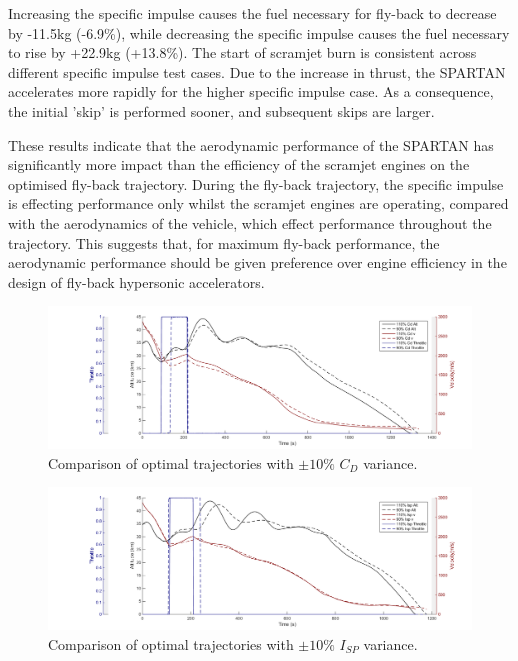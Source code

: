 Increasing the specific impulse causes the fuel necessary for fly-back to decrease by -11.5kg (-6.9\%), while decreasing the specific impulse causes the fuel necessary to rise by +22.9kg (+13.8\%). The start of scramjet burn is consistent across different specific impulse test cases. Due to the increase in thrust, the SPARTAN accelerates more rapidly for the higher specific impulse case. As a consequence, the initial 'skip' is performed sooner, and subsequent skips are larger. 

These results indicate that the aerodynamic performance of the SPARTAN has significantly more impact than the efficiency of the scramjet engines on the optimised fly-back trajectory. During the fly-back trajectory, the specific impulse is effecting performance only whilst the scramjet engines are operating, compared with the aerodynamics of the vehicle, which effect performance throughout the trajectory. This suggests that, for maximum fly-back performance, the aerodynamic performance should be given preference over engine efficiency in the design of fly-back hypersonic accelerators. 

\begin{figure}[ht]
	\centering
	\includegraphics[width=0.9\linewidth]{Figures/6_flyback/CdVariation}
	\caption{Comparison of optimal trajectories with $\pm10\%$ $C_D$ variance.}
	\label{fig:CdVariation}
\end{figure}

\begin{figure}[ht]
	\centering
	\includegraphics[width=0.9\linewidth]{Figures/6_flyback/IspVariation}
	\caption{Comparison of optimal trajectories with $\pm10\%$ $I_{SP}$ variance.}
	\label{fig:IspVariation}
\end{figure}



